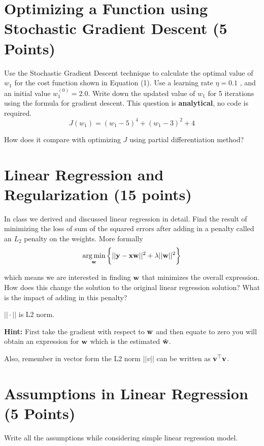 \documentclass[12pt, xcolor=dvipsnames,svgnames,x11names]{article}
\makeatletter
\newenvironment{multiequation}[1][]{%
\begin{equation}%
   \begin{aligned}%
   \ifx#1\@empty\else\label{#1}\fi%
}{%
   \end{aligned}%
\end{equation}%
}
\makeatother
\begin{document}
\section{Optimizing a Function using Stochastic Gradient Descent (5 Points)}
Use the Stochastic Gradient Descent technique to calculate the optimal value of 
$w_1$ for the cost function shown in Equation (1). Use a learning rate 
$\eta = 0.1$ , and an initial value 
$w_1^{(0)} = 2.0$.
Write down the updated value of 
$w_1$ for 5 iterations using the formula for gradient descent. \newline
This question is \textbf{analytical}, no code is required.
\begin{equation}
    J(w_1) = (w_1-5)^4 + (w_1-3)^2 +  4
\end{equation}

How does it compare with optimizing $J$ using partial differentiation method?

\section{Linear Regression and Regularization (15 points)}
In class we derived and discussed linear regression in detail. Find the result of minimizing the
loss of sum of the squared errors after adding in a penalty called an $L_2$ penalty on the weights.
More formally
\begin{multiequation}
\argmin_\wbf \bigg\{ ||\ybf - \xbf \wbf||^2  + \lambda||\wbf||^2  \bigg\}
\end{multiequation}

which means we are interested in finding ${\mathbf w}$ that minimizes the overall expression. How does this change the solution to the original linear regression solution? What is the impact of adding in this penalty?

$|| \cdot ||$ is L2 norm.

\textbf{Hint:} First take the gradient with respect to ${\mathbf w}$ and then equate to zero you will obtain an expression for ${\mathbf w}$ which is the estimated $\hat{{\mathbf w}}$.

Also, remember in vector form the L2 norm $||v||$ can be written as ${\mathbf v}^\top {\mathbf v}$.

\section{Assumptions in Linear Regression (5 Points)}

Write all the assumptions while considering simple linear regression model.
\end{document}
